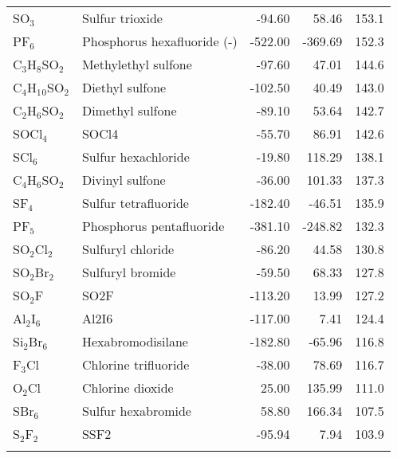 \begin{table}
\begin{center}
\begin{tabular}{llrrr}
 SO$_3$               & Sulfur trioxide                        &  -94.60   &    58.46   &  153.1\\
 PF$_6$               & Phosphorus hexafluoride (-)            & -522.00   &  -369.69   &  152.3\\
 C$_3$H$_8$SO$_2$     & Methylethyl sulfone                    &  -97.60   &    47.01   &  144.6\\
 C$_4$H$_1$$_0$SO$_2$ & Diethyl sulfone                        & -102.50   &    40.49   &  143.0\\
 C$_2$H$_6$SO$_2$     & Dimethyl sulfone                       &  -89.10   &    53.64   &  142.7\\
 SOCl$_4$             & SOCl4                                  &  -55.70   &    86.91   &  142.6\\
 SCl$_6$              & Sulfur hexachloride                    &  -19.80   &   118.29   &  138.1\\
 C$_4$H$_6$SO$_2$     & Divinyl sulfone                        &  -36.00   &   101.33   &  137.3\\
 SF$_4$               & Sulfur tetrafluoride                   & -182.40   &   -46.51   &  135.9\\
 PF$_5$               & Phosphorus pentafluoride               & -381.10   &  -248.82   &  132.3\\
 SO$_2$Cl$_2$         & Sulfuryl chloride                      &  -86.20   &    44.58   &  130.8\\
 SO$_2$Br$_2$         & Sulfuryl bromide                       &  -59.50   &    68.33   &  127.8\\
 SO$_2$F              & SO2F                                   & -113.20   &    13.99   &  127.2\\
 Al$_2$I$_6$          & Al2I6                                  & -117.00   &     7.41   &  124.4\\
 Si$_2$Br$_6$         & Hexabromodisilane                      & -182.80   &   -65.96   &  116.8\\
 F$_3$Cl              & Chlorine trifluoride                   &  -38.00   &    78.69   &  116.7\\
 O$_2$Cl              & Chlorine dioxide                       &   25.00   &   135.99   &  111.0\\
 SBr$_6$              & Sulfur hexabromide                     &   58.80   &   166.34   &  107.5\\
 S$_2$F$_2$           & SSF2                                   &  -95.94   &     7.94   &  103.9\\
$$
\end{tabular}
\end{center}
\end{table}
